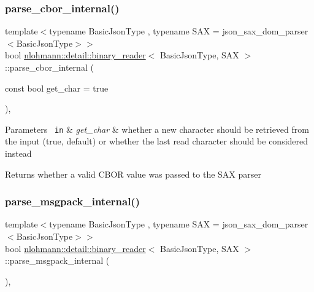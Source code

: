 \subsubsection{\texorpdfstring{parse\_cbor\_internal()}{parse\_cbor\_internal()}}
{\footnotesize\ttfamily template$<$typename Basic\+Json\+Type , typename S\+AX  = json\+\_\+sax\+\_\+dom\+\_\+parser$<$\+Basic\+Json\+Type$>$$>$ \\
bool \mbox{\hyperlink{classnlohmann_1_1detail_1_1binary__reader}{nlohmann\+::detail\+::binary\+\_\+reader}}$<$ Basic\+Json\+Type, S\+AX $>$\+::parse\+\_\+cbor\+\_\+internal (\begin{DoxyParamCaption}\item[{const bool}]{get\+\_\+char = {\ttfamily true} }\end{DoxyParamCaption})\hspace{0.3cm}{\ttfamily [inline]}, {\ttfamily [private]}}


\begin{DoxyParams}[1]{Parameters}
\mbox{\texttt{ in}}  & {\em get\+\_\+char} & whether a new character should be retrieved from the input (true, default) or whether the last read character should be considered instead\\
\hline
\end{DoxyParams}
\begin{DoxyReturn}{Returns}
whether a valid C\+B\+OR value was passed to the S\+AX parser 
\end{DoxyReturn}
\mbox{\label{classnlohmann_1_1detail_1_1binary__reader_a81611d8a5faec1348d31f7e98fcd05ef}} 
\subsubsection{\texorpdfstring{parse\_msgpack\_internal()}{parse\_msgpack\_internal()}}
{\footnotesize\ttfamily template$<$typename Basic\+Json\+Type , typename S\+AX  = json\+\_\+sax\+\_\+dom\+\_\+parser$<$\+Basic\+Json\+Type$>$$>$ \\
bool \mbox{\hyperlink{classnlohmann_1_1detail_1_1binary__reader}{nlohmann\+::detail\+::binary\+\_\+reader}}$<$ Basic\+Json\+Type, S\+AX $>$\+::parse\+\_\+msgpack\+\_\+internal (\begin{DoxyParamCaption}{ }\end{DoxyParamCaption})\hspace{0.3cm}{\ttfamily [inline]}, {\ttfamily [private]}}

